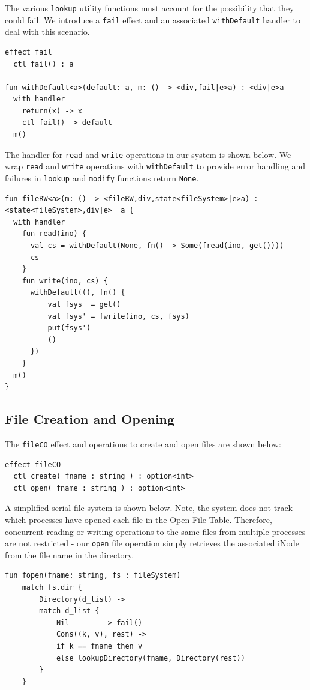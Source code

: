 \documentclass[logo,bsc,singlespacing,parskip]{infthesis}
\begin{document}
The various \texttt{lookup} utility functions must account for the possibility that they could fail. We introduce a \texttt{fail} effect and an associated \texttt{withDefault} handler to deal with this scenario.

\begin{lstlisting}
effect fail
  ctl fail() : a

fun withDefault<a>(default: a, m: () -> <div,fail|e>a) : <div|e>a
  with handler
    return(x) -> x
    ctl fail() -> default
  m()
\end{lstlisting}

The  handler for \lstinline{read} and \lstinline{write} operations in our system is shown below. We wrap \lstinline{read} and \lstinline{write} operations with \lstinline{withDefault} to provide error handling and failures in \lstinline{lookup} and \lstinline{modify} functions return \lstinline{None}.


\begin{lstlisting}
fun fileRW<a>(m: () -> <fileRW,div,state<fileSystem>|e>a) : <state<fileSystem>,div|e>  a {
  with handler
    fun read(ino) {
      val cs = withDefault(None, fn() -> Some(fread(ino, get())))
      cs
    }
    fun write(ino, cs) {
      withDefault((), fn() {
          val fsys  = get()
          val fsys' = fwrite(ino, cs, fsys)
          put(fsys')
          ()
      })
    }
  m()
}
\end{lstlisting}


\subsection{File Creation and Opening}

The \lstinline{fileCO} effect and operations to create and open files are shown below:

\begin{lstlisting}
effect fileCO
  ctl create( fname : string ) : option<int>
  ctl open( fname : string ) : option<int>
\end{lstlisting}
A simplified serial file system is shown below. Note, the system does not track which processes have opened each file in the Open File Table. Therefore, concurrent reading or writing operations to the same files from multiple processes are not restricted - our \lstinline{open} file operation simply retrieves the associated iNode from the file name in the directory.

\begin{lstlisting}
fun fopen(fname: string, fs : fileSystem) 
    match fs.dir {
        Directory(d_list) ->
        match d_list {
            Nil        -> fail()  
            Cons((k, v), rest) ->
            if k == fname then v
            else lookupDirectory(fname, Directory(rest))
        }
    }
\end{lstlisting}    
\end{document}
